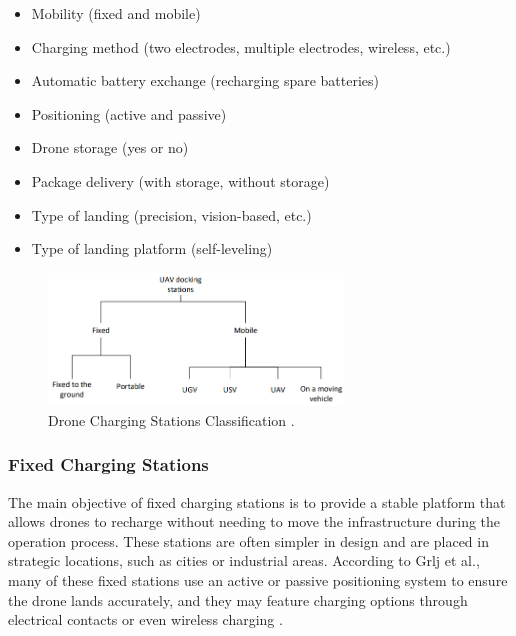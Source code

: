     \begin{itemize}
        \item Mobility (fixed and mobile)
        \item Charging method (two electrodes, multiple electrodes, wireless, etc.)
        \item Automatic battery exchange (recharging spare batteries)
        \item Positioning (active and passive)
        \item Drone storage (yes or no)
        \item Package delivery (with storage, without storage)
        \item Type of landing (precision, vision-based, etc.)
        \item Type of landing platform (self-leveling)
    \end{itemize}

    \begin{figure}[h!]
        \centering
        \includegraphics[width=0.7\textwidth]{pictures/charging_classification.png}
        \caption{Drone Charging Stations Classification \cite{grlj_docking_stations}.}
        \label{fig:charging_classification}
    \end{figure}

\subsubsection{Fixed Charging Stations}

    The main objective of fixed charging stations is to provide a stable platform that allows drones to recharge without needing to move the infrastructure during the operation process. These stations are often simpler in design and are placed in strategic locations, such as cities or industrial areas. According to Grlj et al., many of these fixed stations use an active or passive positioning system to ensure the drone lands accurately, and they may feature charging options through electrical contacts or even wireless charging \cite{grlj_docking_stations}.

